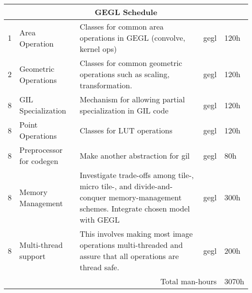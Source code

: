 \begin{flushleft}
\begin{tabular}{|l|p{3cm}|p{5cm}|p{2cm}|l|}
\multicolumn{5}{|c|}{\bf GEGL Schedule}\\
\hline
1 & Area Operation & Classes for common area operations in GEGL (convolve, kernel ops) & gegl & 120h\\
\hline
2 & Geometric Operations & Classes for common geometric operations such as scaling, transformation. & gegl & 120h\\
\hline
8 & GIL Specialization & Mechanism for allowing partial specialization in GIL code & gegl & 120h\\
\hline
8 & Point Operations & Classes for LUT operations & gegl & 120h\\
\hline
8 & Preprocessor for codegen & Make another abstraction for gil & gegl & 80h\\
\hline
8 & Memory Management & Investigate trade-offs among tile-, micro tile-, and divide-and-conquer memory-management schemes. Integrate chosen model with GEGL & gegl & 300h\\
\hline
8 & Multi-thread support & This involves making most image operations multi-threaded and assure that all operations are thread safe. & gegl & 200h\\  
\hline

 
\multicolumn{4}{|r|}{Total man-hours} & 3070h\\
\hline
\end{tabular}
\end{flushleft}

	
